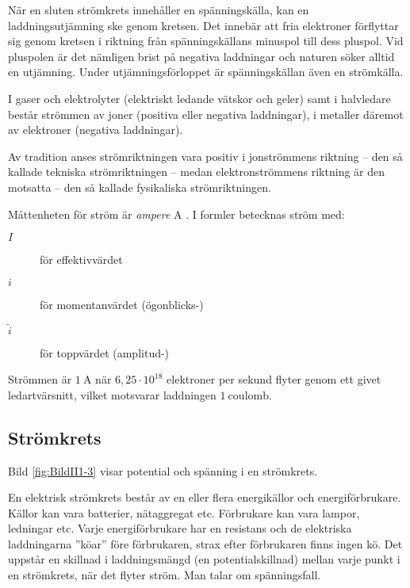 När en sluten strömkrets innehåller en spänningskälla, kan en
laddningsutjämning ske genom kretsen.
Det innebär att fria elektroner förflyttar sig genom kretsen i riktning från
spänningskällans minuspol till dess pluspol.
Vid pluspolen är det nämligen brist på negativa laddningar och naturen söker
alltid en utjämning.
Under utjämningsförloppet är spänningskällan även en strömkälla.

I gaser och elektrolyter (elektriskt ledande vätskor och geler) samt i
halvledare består strömmen av joner (positiva eller negativa laddningar),
i metaller däremot av elektroner (negativa laddningar).

Av tradition anses strömriktningen vara positiv i jonströmmens riktning -- den
så kallade tekniska strömriktningen -- medan elektronströmmens riktning är den
motsatta -- den så kallade fysikaliska strömriktningen.

Måttenheten för ström är \emph{ampere} \(\mathrm{A}\) \cite{SIbrochure8}.
I formler betecknas ström med:

\begin{description}
\item[\(I\)] för effektivvärdet
\item[\(i\)] för momentanvärdet (ögonblicks-)
\item[\(\hat{i}\)] för toppvärdet (amplitud-)
\end{description}

Strömmen är \(1\ \mathrm{A}\) när \(6,25 \cdot 10^{18}\) elektroner per sekund
flyter genom ett givet ledartvärsnitt, vilket motsvarar laddningen
\(1\ \mathrm{coulomb}\).

\subsection{Strömkrets}
\frdjp
{}


Bild \ref{fig:BildII1-3} visar potential och spänning i en strömkrets.

En elektrisk strömkrets består av en eller flera energikällor och
energiförbrukare.
Källor kan vara batterier, nätaggregat etc.
Förbrukare kan vara lampor, ledningar etc.
Varje energiförbrukare har en resistans och de elektriska laddningarna ''köar''
före förbrukaren, strax efter förbrukaren finns ingen kö.
Det uppstår en skillnad i laddningsmängd (en potentialskillnad) mellan varje
punkt i en strömkrets, när det flyter ström.
Man talar om spänningsfall.

